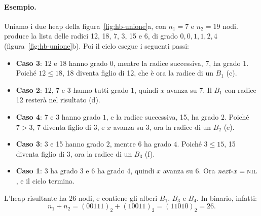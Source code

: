 \paragraph{Esempio.}
Uniamo i due heap della figura~\ref{fig:hb-unione}a, con $n_1 = 7$ e $n_2 = 19$ nodi. \BinomialHeapMerge{} produce la lista delle radici 12, 18, 7, 3, 15 e 6, di grado $0, 0, 1, 1, 2, 4$ (figura~\ref{fig:hb-unione}b). Poi il ciclo esegue i seguenti passi:
\begin{itemize}
    \item \textbf{Caso 3}: 12 e 18 hanno grado $0$, mentre la radice successiva, 7, ha grado $1$. Poiché $12 \le 18$, 18 diventa figlio di 12, che è ora la radice di un $B_1$ (c).
    \item \textbf{Caso 2}: 12, 7 e 3 hanno tutti grado $1$, quindi $x$ avanza su 7. Il $B_1$ con radice 12 resterà nel risultato (d).
    \item \textbf{Caso 4}: 7 e 3 hanno grado $1$, e la radice successiva, 15, ha grado $2$. Poiché $7 > 3$, 7 diventa figlio di 3, e $x$ avanza su 3, ora la radice di un $B_2$ (e).
    \item \textbf{Caso 3}: 3 e 15 hanno grado $2$, mentre 6 ha grado $4$. Poiché $3 \le 15$, 15 diventa figlio di 3, ora la radice di un $B_3$ (f).
    \item \textbf{Caso 1}: 3 ha grado $3$ e 6 ha grado $4$, quindi $x$ avanza su 6. Ora $\mathit{next}\text{-}x = \textsc{nil}$, e il ciclo termina.
\end{itemize}
L'heap risultante ha $26$ nodi, e contiene gli alberi $B_1$, $B_3$ e $B_4$. In binario, infatti:
\[
n_1 + n_2 = (00111)_2 + (10011)_2 = (11010)_2 = 26.
\]

